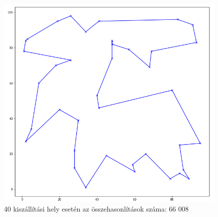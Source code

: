 \begin{figure}[h!]
\centering
\includegraphics[scale=0.4]{images/40.png}
\caption{40 kiszállítási hely esetén az összehasonlítások száma: 66 008}
\label{fig:tsp40location}
\end{figure}

